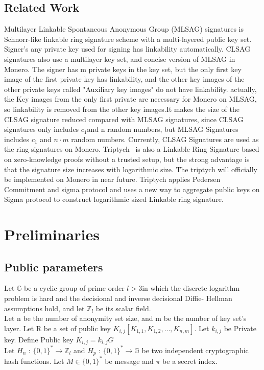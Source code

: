 \subsection{Related Work}
    Multilayer Linkable Spontaneous Anonymous Group (MLSAG) signatures is Schnorr-like linkable ring signature scheme with a multi-layered public key set. Signer's any private key used for signing has linkability automatically. CLSAG ~\cite{clsag} signatures also use a multilayer key set, and concise version of MLSAG in Monero. The signer has m private keys in the key set, but the only first key image of the first private key has linkability, and the other key images of the other private keys called "Auxiliary key images" do not have linkability. actually, the Key images from the only first private are necessary for Monero on MLSAG, so linkability is removed from the other key images.It makes the size of the CLSAG signature reduced compared with MLSAG signatures, since CLSAG signatures only includes $c_{1}$and n random numbers, but MLSAG Signatures includes $c_{1}$ and $n\cdot m$ random numbers. Currently, CLSAG Signatures are used as the ring signatures on Monero. Triptych~\cite{triptych} is also a Linkable Ring Signature based on zero-knowledge proofs without a trusted setup, but the strong advantage is that the signature size increases with logarithmic size. The triptych will officially be implemented on Monero in near future. Triptych applies Pedersen Commitment and sigma protocol and uses a new way to aggregate public keys on Sigma protocol to construct logarithmic sized Linkable ring signature.
    
\section{Preliminaries}
\subsection{Public parameters}
    Let $\mathbb G$ be a cyclic group of prime order $l > 3 $in which the discrete logarithm problem is hard and the decisional and inverse decisional Diffie- Hellman assumptions hold, and let ${\mathbb Z}_{l}$ be its scalar field.\\
    Let n be the number of anonymity set size, and m be the number of key set's layer. Let R be a set of public key $K_{i,j} [K_{1,1},K_{1,2},\ldots,K_{n,m}]$. Let $k_{i,j}$ be Private key. Define Public key $K_{i,j}=k_{i,j}G$\\
    Let $H_n$ : $ \{0,1 \} ^* \rightarrow {\mathbb Z}_{l}$ and $H_p$ : $ \{0,1 \} ^* \rightarrow \mathbb G$ be two independent cryptographic hash functions. Let $M \in \{ 0,1 \}^*$ be message and $\pi $ be a secret index.
    
